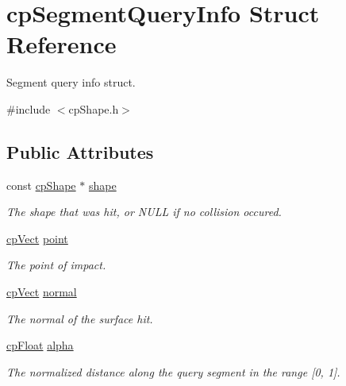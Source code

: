\hypertarget{structcp_segment_query_info}{}\section{cp\+Segment\+Query\+Info Struct Reference}
\label{structcp_segment_query_info}


Segment query info struct.  




{\ttfamily \#include $<$cp\+Shape.\+h$>$}

\subsection*{Public Attributes}
\begin{DoxyCompactItemize}
\item 
\hypertarget{structcp_segment_query_info_a1644aedf3beee1c910f0361ff73e50eb}{}const \hyperlink{structcp_shape}{cp\+Shape} $\ast$ \hyperlink{structcp_segment_query_info_a1644aedf3beee1c910f0361ff73e50eb}{shape}\label{structcp_segment_query_info_a1644aedf3beee1c910f0361ff73e50eb}

\begin{DoxyCompactList}\small\item\em The shape that was hit, or N\+U\+L\+L if no collision occured. \end{DoxyCompactList}\item 
\hypertarget{structcp_segment_query_info_ac18fb70008b01420c06a407e3d95923a}{}\hyperlink{structcp_vect}{cp\+Vect} \hyperlink{structcp_segment_query_info_ac18fb70008b01420c06a407e3d95923a}{point}\label{structcp_segment_query_info_ac18fb70008b01420c06a407e3d95923a}

\begin{DoxyCompactList}\small\item\em The point of impact. \end{DoxyCompactList}\item 
\hypertarget{structcp_segment_query_info_a453d113d757becaab1363e80c9a54e76}{}\hyperlink{structcp_vect}{cp\+Vect} \hyperlink{structcp_segment_query_info_a453d113d757becaab1363e80c9a54e76}{normal}\label{structcp_segment_query_info_a453d113d757becaab1363e80c9a54e76}

\begin{DoxyCompactList}\small\item\em The normal of the surface hit. \end{DoxyCompactList}\item 
\hypertarget{structcp_segment_query_info_af5b6ff0d0b32196cf2716e9672604c61}{}\hyperlink{group__basic_types_gac1ed65573e035bf892505768c852d8d3}{cp\+Float} \hyperlink{structcp_segment_query_info_af5b6ff0d0b32196cf2716e9672604c61}{alpha}\label{structcp_segment_query_info_af5b6ff0d0b32196cf2716e9672604c61}

\begin{DoxyCompactList}\small\item\em The normalized distance along the query segment in the range \mbox{[}0, 1\mbox{]}. \end{DoxyCompactList}\end{DoxyCompactItemize}


